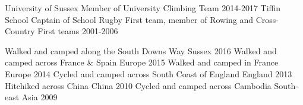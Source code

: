 \begin{cvhonors}
  \cvhonor
    {University of Sussex}
    {Member of University Climbing Team}
    {}
    {2014-2017}
  \cvhonor
    {Tiffin School}
    {Captain of School Rugby First team, member of Rowing and Cross-Country First teams}
    {}
    {2001-2006}
\end{cvhonors}

\begin{cvhonors}
  \cvhonor
    {Walked and camped along the South Downs Way}
    {}
    {Sussex}
    {2016}
  \cvhonor
    {Walked and camped across France \& Spain}
    {}
    {Europe}
    {2015}
  \cvhonor
    {Walked and camped in France}
    {}
    {Europe}
    {2014}
  \cvhonor
    {Cycled and camped across South Coast of England}
    {}
    {England}
    {2013}
 \cvhonor
    {Hitchiked across China}
    {}
    {China}
    {2010}
 \cvhonor
    {Cycled and camped across Cambodia}
    {}
    {South-east Asia}
    {2009}
\end{cvhonors}
